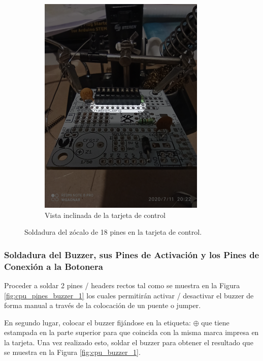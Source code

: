 \documentclass{article}
\begin{document}
\begin{figure}[H]
\begin{subfigure}[t]{0.3\textwidth}
        \includegraphics[width=0.9\columnwidth, height=1.2\columnwidth]{images/CPU/cpu_zocalo_3.png}
        \caption{Vista inclinada de la tarjeta de control}
        \label{fig:cpu_zocalo_3}
    \end{subfigure}
    \caption{Soldadura del zócalo de 18 pines en la tarjeta de control.}
    \label{fig:cpu_zocalo}
\end{figure}

\subsubsection{Soldadura del Buzzer, sus Pines de Activación y los Pines de Conexión a la Botonera}
Proceder a soldar 2 pines / headers rectos tal como se muestra en la Figura \ref{fig:cpu_pines_buzzer_1} los cuales permitirán activar / desactivar el buzzer de forma manual a través de la colocación de un puente o jumper.

En segundo lugar, colocar el buzzer fijándose en la etiqueta: $\oplus$ que tiene estampada en la parte superior para que coincida con la misma marca impresa en la tarjeta. Una vez realizado esto, soldar el buzzer para obtener el resultado que se muestra en la Figura \ref{fig:cpu_buzzer_1}.
\end{document}
